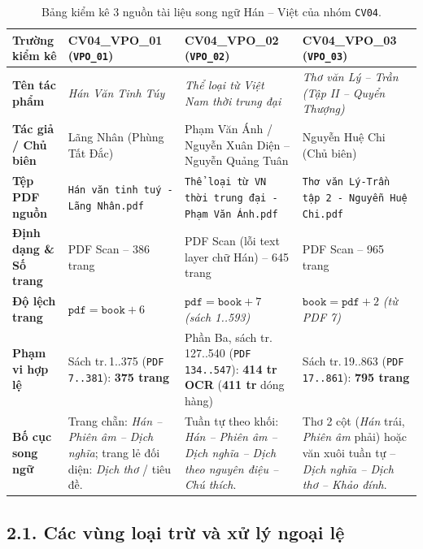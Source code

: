 \documentclass[11pt,a4paper]{article}
\begin{document}
\vspace{0.15em}
\begin{table}[h!]
\centering
\small
\begin{tabular}{L{2.7cm} L{4.0cm} L{4.2cm} L{4.2cm}}
\toprule
\textbf{Trường kiểm kê} & \textbf{CV04\_VPO\_01 (\texttt{VPO\_01})} & \textbf{CV04\_VPO\_02 (\texttt{VPO\_02})} & \textbf{CV04\_VPO\_03 (\texttt{VPO\_03})} \\
\midrule
\textbf{Tên tác phẩm} & \textit{Hán Văn Tinh Túy} & \textit{Thể loại từ Việt Nam thời trung đại} & \textit{Thơ văn Lý -- Trần (Tập II -- Quyển Thượng)} \\
\addlinespace[0.2em]
\textbf{Tác giả / Chủ biên} & Lãng Nhân (Phùng Tất Đắc) & Phạm Văn Ánh / Nguyễn Xuân Diện -- Nguyễn Quảng Tuân & Nguyễn Huệ Chi (Chủ biên) \\
\addlinespace[0.2em]
\textbf{Tệp PDF nguồn} & \texttt{Hán văn tinh tuý - Lãng Nhân.pdf} & \texttt{Thể loại từ VN thời trung đại - Phạm Văn Ánh.pdf} & \texttt{Thơ văn Lý-Trần tập 2 - Nguyễn Huệ Chi.pdf} \\
\addlinespace[0.2em]
\textbf{Định dạng \& Số trang} & PDF Scan -- 386 trang & PDF Scan (lỗi text layer chữ Hán) -- 645 trang & PDF Scan -- 965 trang \\
\addlinespace[0.2em]
\textbf{Độ lệch trang} & $\texttt{pdf} = \texttt{book} + 6$ & $\texttt{pdf} = \texttt{book} + 7$ \textit{(sách 1..593)} & $\texttt{book} = \texttt{pdf} + 2$ \textit{(từ PDF 7)} \\
\addlinespace[0.2em]
\textbf{Phạm vi hợp lệ} & Sách tr.\,1..375 (\texttt{PDF 7..381}): \textbf{375 trang} & Phần Ba, sách tr.\,127..540 (\texttt{PDF 134..547}): \textbf{414 tr OCR} (\textbf{411 tr} dóng hàng) & Sách tr.\,19..863 (\texttt{PDF 17..861}): \textbf{795 trang} \\
\addlinespace[0.2em]
\textbf{Bố cục song ngữ} & Trang chẵn: \textit{Hán -- Phiên âm -- Dịch nghĩa}; trang lẻ đối diện: \textit{Dịch thơ} / tiêu đề. & Tuần tự theo khối: \textit{Hán -- Phiên âm -- Dịch nghĩa -- Dịch theo nguyên điệu -- Chú thích}. & Thơ 2 cột (\textit{Hán} trái, \textit{Phiên âm} phải) hoặc văn xuôi tuần tự -- \textit{Dịch nghĩa -- Dịch thơ -- Khảo đính}. \\
\bottomrule
\end{tabular}
\caption{Bảng kiểm kê 3 nguồn tài liệu song ngữ Hán -- Việt của nhóm \texttt{CV04}.}
\end{table}

\subsection{2.1. Các vùng loại trừ và xử lý ngoại lệ}
\end{document}
